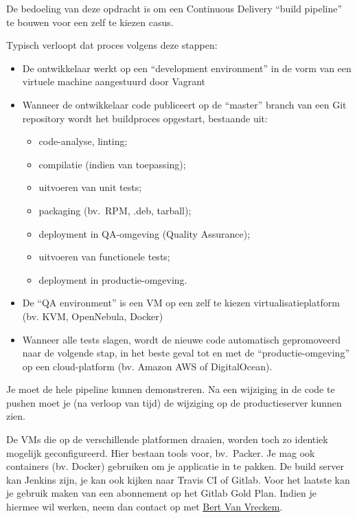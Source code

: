 De bedoeling van deze opdracht is om een Continuous Delivery ``build pipeline'' te bouwen voor een zelf te kiezen casus.

Typisch verloopt dat proces volgens deze stappen:

\begin{itemize}
\item De ontwikkelaar werkt op een ``development environment'' in de vorm van een virtuele machine aangestuurd door Vagrant
\item Wanneer de ontwikkelaar code publiceert op de ``master'' branch van een Git repository wordt het buildproces opgestart, bestaande uit:

  \begin{itemize}
  \item code-analyse, linting;
  \item compilatie (indien van toepassing);
  \item uitvoeren van unit tests;
  \item packaging (bv.~RPM, .deb, tarball);
  \item deployment in QA-omgeving (Quality Assurance);
  \item uitvoeren van functionele tests;
  \item deployment in productie-omgeving.
  \end{itemize}

\item De ``QA environment'' is een VM op een zelf te kiezen virtualisatieplatform (bv. KVM, OpenNebula, Docker)
\item Wanneer alle tests slagen, wordt de nieuwe code automatisch gepromoveerd naar de volgende stap, in het beste geval tot en met de ``productie-omgeving'' op een cloud-platform (bv. Amazon AWS of DigitalOcean).
\end{itemize}

Je moet de hele pipeline kunnen demonstreren. Na een wijziging in de code te pushen moet je (na verloop van tijd) de wijziging op de productieserver kunnen zien.

De VMs die op de verschillende platformen draaien, worden toch zo identiek mogelijk geconfigureerd. Hier bestaan tools voor, bv.~Packer.  Je mag ook containers (bv. Docker) gebruiken om je applicatie in te pakken. De build server kan Jenkins zijn, je kan ook kijken naar Travis CI of Gitlab. Voor het laatste kan je gebruik maken van een abonnement op het Gitlab Gold Plan. Indien je hiermee wil werken, neem dan contact op met \href{mailto:bert.vanvreckem@hogent.be}{Bert Van Vreckem}.

